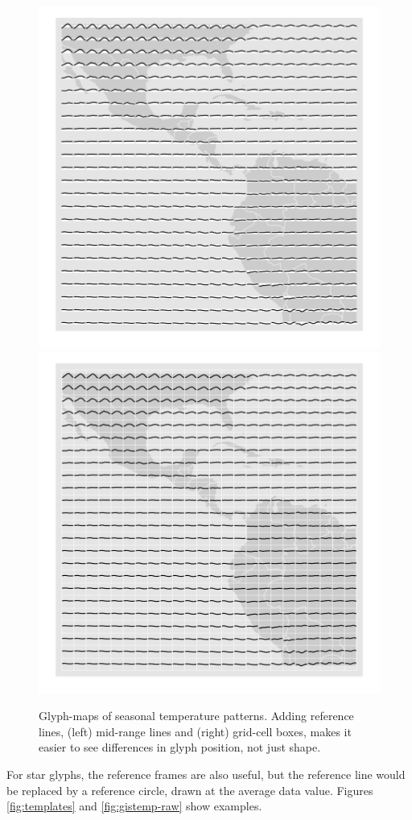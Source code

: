 \documentclass[oneside]{article}
\begin{document}
\begin{figure}[htbp]
  \centering
  \includegraphics[width=0.5\linewidth]{ref-line}%
  \includegraphics[width=0.5\linewidth]{ref-box}

  \caption{Glyph-maps of seasonal temperature patterns. Adding reference lines, (left) mid-range lines and (right) grid-cell boxes, makes it easier to see differences in glyph position, not just shape.}
  \label{fig:ref-basic}
\end{figure}

For star glyphs, the reference frames are also useful, but the reference line would be replaced by a reference circle, drawn at the average data value. Figures \ref{fig:templates} and \ref{fig:gistemp-raw} show examples.


\end{document}
